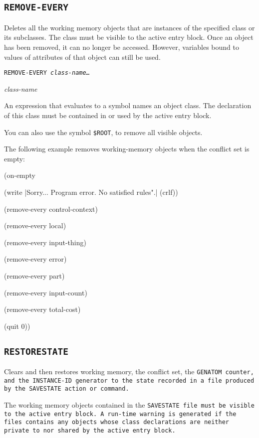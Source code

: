 {{\subsection{\tt{REMOVE-EVERY}}

Deletes all the working memory objects that are instances of the
specified class or its subclasses. The class must be visible to the
active entry block. Once an object has been removed, it can no longer
be accessed. However, variables bound to values of attributes of that
object can still be used.

\Format

\tt{REMOVE-EVERY} \it{class-name}\ldots

\Argument

\it{class-name}

An expression that evaluates to a symbol names an object class. The
declaration of this class must be contained in or used by the active
entry block.

You can also use the symbol
\verb|$ROOT|, to remove all visible objects.

\Example

The following example removes working-memory objects when the conflict
set is empty:

(on-empty

(write |Sorry... Program error. No satisfied rules".| (crlf))

(remove-every control-context)

(remove-every local)

(remove-every input-thing)

(remove-every error)

(remove-every part)

(remove-every input-count)

(remove-every total-cost)

(quit 0))

\subsection{\tt{RESTORESTATE}}

Clears and then restores working memory, the conflict set, the \tt{GENATOM}
counter, and the \tt{INSTANCE-ID} generator to the state recorded in a file
produced by the \tt{SAVESTATE} action or command.

The working memory objects contained in the \tt{SAVESTATE} file must be
visible to the active entry block. A run-time warning is generated if
the files contains any objects whose class declarations are neither
private to nor shared by the active entry block.

}}

